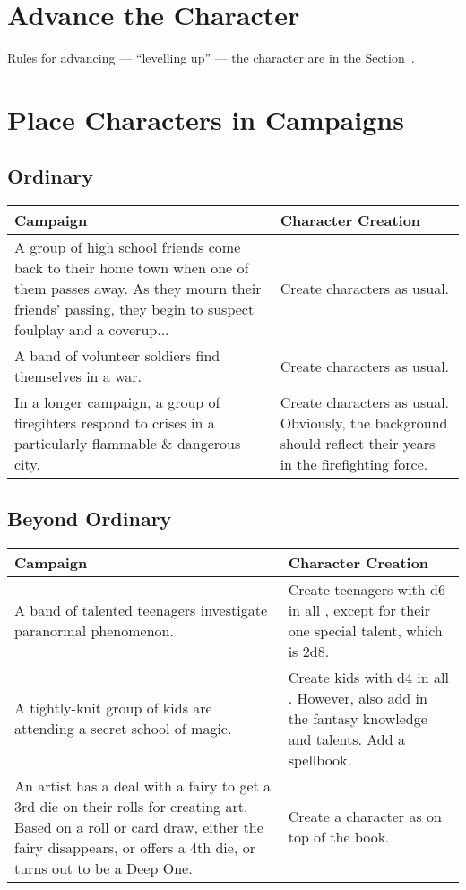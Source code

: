 \section{Advance the Character}

Rules for advancing --- ``levelling up'' --- the character are in the
Section~.


\section{Place Characters in Campaigns}
\subsection{Ordinary}
\begin{center}
	\begin{xltabular}{\textwidth}{XX}
		Campaign & Character Creation \\
		\hline
		A group of high school friends come back to their home town when one of them passes away. As they mourn their friends' passing, they begin to suspect foulplay and a coverup... & Create characters as usual. \\
		A band of volunteer soldiers find themselves in a war. & Create characters as usual. \\
		In a longer campaign, a group of firegihters respond to crises in a particularly flammable \& dangerous city. & Create characters as usual. Obviously, the background should reflect their years in the firefighting force. \\
	\end{xltabular}
\end{center}


\subsection{Beyond Ordinary}
\begin{center}
	\begin{xltabular}{\textwidth}{XX}
		Campaign & Character Creation \\
		\hline
		A band of talented teenagers investigate paranormal phenomenon.
			& Create teenagers with d6 in all , except for their one special talent, which is 2d8.\\
   		A tightly-knit group of kids are attending a secret school of magic.
			& Create kids with d4 in all . However, also add in the fantasy knowledge and talents. Add a spellbook. \\
		An artist has a deal with a fairy to get a 3rd die on their  rolls for creating art.
			Based on a roll or card draw, either the fairy disappears, or offers a 4th die, or turns out to be a Deep One.
			& Create a  character as on top of the book. \\
	\end{xltabular}
\end{center}

